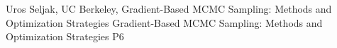 {}	%
{}		%
{Uros Seljak, UC Berkeley, Gradient-Based MCMC Sampling: Methods and Optimization Strategies}	%
{Gradient-Based MCMC Sampling: Methods and Optimization Strategies}		%
{P6}		%
\\\hline
